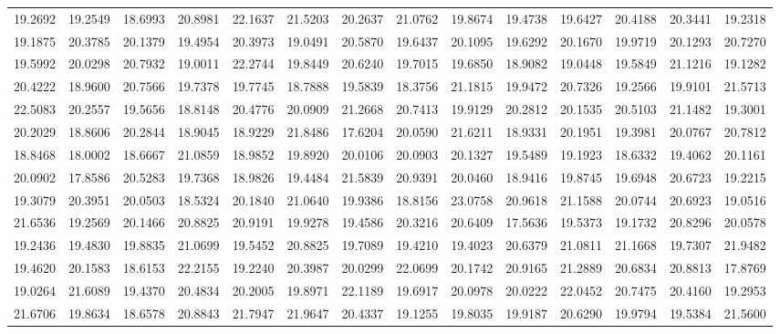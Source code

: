 \documentclass[12pt]{article}\usepackage[]{graphicx}\usepackage[]{color}
\begin{document}
\begin{landscape}
\begin{longtable}[t]{rrrrrrrrrrrrrr}
19.2692 & 19.2549 & 18.6993 & 20.8981 & 22.1637 & 21.5203 & 20.2637 & 21.0762 & 19.8674 & 19.4738 & 19.6427 & 20.4188 & 20.3441 & 19.2318\\
19.1875 & 20.3785 & 20.1379 & 19.4954 & 20.3973 & 19.0491 & 20.5870 & 19.6437 & 20.1095 & 19.6292 & 20.1670 & 19.9719 & 20.1293 & 20.7270\\
19.5992 & 20.0298 & 20.7932 & 19.0011 & 22.2744 & 19.8449 & 20.6240 & 19.7015 & 19.6850 & 18.9082 & 19.0448 & 19.5849 & 21.1216 & 19.1282\\
20.4222 & 18.9600 & 20.7566 & 19.7378 & 19.7745 & 18.7888 & 19.5839 & 18.3756 & 21.1815 & 19.9472 & 20.7326 & 19.2566 & 19.9101 & 21.5713\\
22.5083 & 20.2557 & 19.5656 & 18.8148 & 20.4776 & 20.0909 & 21.2668 & 20.7413 & 19.9129 & 20.2812 & 20.1535 & 20.5103 & 21.1482 & 19.3001\\
20.2029 & 18.8606 & 20.2844 & 18.9045 & 18.9229 & 21.8486 & 17.6204 & 20.0590 & 21.6211 & 18.9331 & 20.1951 & 19.3981 & 20.0767 & 20.7812\\
18.8468 & 18.0002 & 18.6667 & 21.0859 & 18.9852 & 19.8920 & 20.0106 & 20.0903 & 20.1327 & 19.5489 & 19.1923 & 18.6332 & 19.4062 & 20.1161\\
20.0902 & 17.8586 & 20.5283 & 19.7368 & 18.9826 & 19.4484 & 21.5839 & 20.9391 & 20.0460 & 18.9416 & 19.8745 & 19.6948 & 20.6723 & 19.2215\\
19.3079 & 20.3951 & 20.0503 & 18.5324 & 20.1840 & 21.0640 & 19.9386 & 18.8156 & 23.0758 & 20.9618 & 21.1588 & 20.0744 & 20.6923 & 19.0516\\
21.6536 & 19.2569 & 20.1466 & 20.8825 & 20.9191 & 19.9278 & 19.4586 & 20.3216 & 20.6409 & 17.5636 & 19.5373 & 19.1732 & 20.8296 & 20.0578\\
19.2436 & 19.4830 & 19.8835 & 21.0699 & 19.5452 & 20.8825 & 19.7089 & 19.4210 & 19.4023 & 20.6379 & 21.0811 & 21.1668 & 19.7307 & 21.9482\\
19.4620 & 20.1583 & 18.6153 & 22.2155 & 19.2240 & 20.3987 & 20.0299 & 22.0699 & 20.1742 & 20.9165 & 21.2889 & 20.6834 & 20.8813 & 17.8769\\
19.0264 & 21.6089 & 19.4370 & 20.4834 & 20.2005 & 19.8971 & 22.1189 & 19.6917 & 20.0978 & 20.0222 & 22.0452 & 20.7475 & 20.4160 & 19.2953\\
21.6706 & 19.8634 & 18.6578 & 20.8843 & 21.7947 & 21.9647 & 20.4337 & 19.1255 & 19.8035 & 19.9187 & 20.6290 & 19.9794 & 19.5384 & 21.5600\\*
\end{longtable}
\end{landscape}
\endgroup{}
\end{document}

